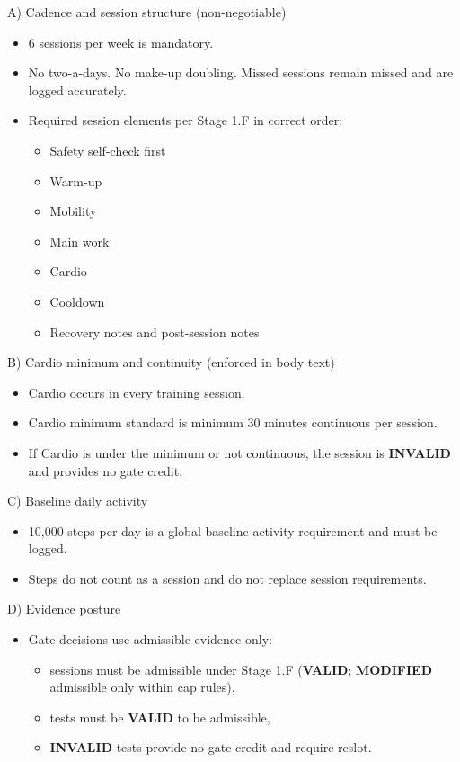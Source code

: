 \documentclass[10pt]{article}
\begin{document}
A) Cadence and session structure (non-negotiable)

\begin{itemize}
\item 6 sessions per week is mandatory.
\item No two-a-days. No make-up doubling. Missed sessions remain missed and are logged accurately.
\item Required session elements per Stage 1.F in correct order:
  \begin{itemize}
  \item Safety self-check first
  \item Warm-up
  \item Mobility
  \item Main work
  \item Cardio
  \item Cooldown
  \item Recovery notes and post-session notes
  \end{itemize}
\end{itemize}

B) Cardio minimum and continuity (enforced in body text)

\begin{itemize}
\item Cardio occurs in every training session.
\item Cardio minimum standard is minimum 30 minutes continuous per session.
\item If Cardio is under the minimum or not continuous, the session is \textbf{INVALID} and provides no gate credit.
\end{itemize}

C) Baseline daily activity

\begin{itemize}
\item 10,000 steps per day is a global baseline activity requirement and must be logged.
\item Steps do not count as a session and do not replace session requirements.
\end{itemize}

D) Evidence posture

\begin{itemize}
\item Gate decisions use admissible evidence only:
  \begin{itemize}
  \item sessions must be admissible under Stage 1.F (\textbf{VALID}; \textbf{MODIFIED} admissible only within cap rules),
  \item tests must be \textbf{VALID} to be admissible,
  \item \textbf{INVALID} tests provide no gate credit and require reslot.
  \end{itemize}
\end{itemize}
\end{document}
